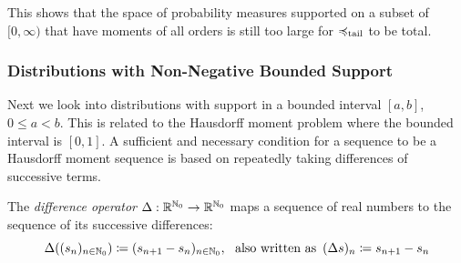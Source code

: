 \documentclass[a4paper]{scrreprt}
\begin{document}
    This shows that the space of probability measures supported on a subset of $[0, \infty)$ that have moments of all orders is still too large for $\preccurlyeq_{\text{tail}}$ to be total.
    
    \subsubsection{Distributions with Non-Negative Bounded Support}
    Next we look into distributions with support in a bounded interval $[a, b]$, $0 \leq a < b$.
    This is related to the Hausdorff moment problem where the bounded interval is $[0, 1]$.
    A sufficient and necessary condition for a sequence to be a Hausdorff moment sequence is based on repeatedly taking differences of successive terms.
    \begin{defn}
        The \emph{difference operator} $\Delta: \mathbb{R}^{\mathbb{N}_0} \to \mathbb{R}^{\mathbb{N}_0}$ maps a sequence of real numbers to the sequence of its successive differences:
        \[
            \Delta((s_n)_{n \in \mathbb{N}_0}) \coloneqq (s_{n+1} - s_n)_{n \in \mathbb{N}_0}, ~ \text{ also written as }\,
            (\Delta s)_n \coloneqq s_{n+1} - s_n
        \]
    \end{defn}
\end{document}
